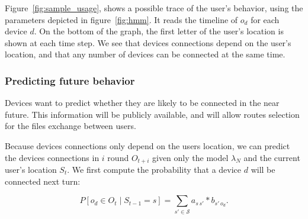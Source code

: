 


Figure~\ref{fig:sample_usage}, shows a possible trace of the user's behavior, using the parameters depicted in figure~\ref{fig:hmm}. 
It reads the timeline of $o_{d}$ for each device $d$. On the bottom of the graph, the first letter of the user's location is shown at each time step.
We see that devices connections depend on the user's location, and that any number of devices can be connected at the same time.




\subsubsection{Predicting future behavior} %
\label{ssub:predicting_future_behavior}
Devices want to predict whether they are likely to be connected in the near future.
This information will be publicly available, and will allow routes selection for the  files exchange between users.

Because devices connections only depend on the users location, we can predict the devices connections in $i$ round $O_{t+i}$ given only the model $\lambda_N$ and the current user's location $S_t$. We first compute the probability that a device $d$ will be connected next turn:

$$
P\left[ o_d \in O_{t} \mid S_{t-1} = s \right] = 
\sum\limits_{s' \in \mathcal{S}} 
a_{s\,s'} * b_{s'\,o_d}.
$$


